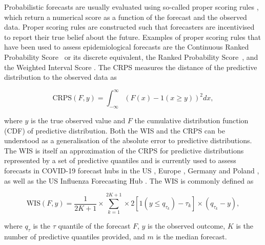 \documentclass{article}
\begin{document}
Probabilistic forecasts are usually evaluated using so-called proper scoring rules \citep{gneitingStrictlyProperScoring2007}, which return a numerical score as a function of the forecast and the observed data. Proper scoring rules are constructed such that forecasters are incentivised to report their true belief about the future. Examples of proper scoring rules that have been used to assess epidemiological forecasts are the Continuous Ranked Probability Score~\citep[CRPS,][]{gneitingStrictlyProperScoring2007} or its discrete equivalent, the Ranked Probability Score~\citep[RPS,][]{funkAssessingPerformanceRealtime2019}, and the Weighted Interval Score \citep{bracherEvaluatingEpidemicForecasts2021}. 
The CRPS measures the distance of the predictive distribution to the observed data as 
\begin{linenomath*}
\begin{equation*}
    \text{CRPS}(F, y) = \int_{-\infty}^\infty \left( F(x) - 1(x \geq y) \right)^2 dx,
\end{equation*}    
\end{linenomath*}
where $y$ is the true observed value and $F$ the cumulative distribution function (CDF) of predictive distribution. Both the WIS and the CRPS can be understood as a generalisation of the absolute error to predictive distributions. The WIS is itself an approximation of the CRPS for predictive distributions represented by a set of predictive quantiles and is currently used to assess forecasts in COVID-19 forecast hubs in the US \citep{cramerCOVID19ForecastHub2020, cramerEvaluationIndividualEnsemble2021}, Europe \citep{sherrattPredictivePerformanceMultimodel2022}, Germany and Poland \citep{bracherShorttermForecastingCOVID192021, bracherNationalSubnationalShortterm2021}, as well as the US Influenza Forecasting Hub \citep{CdcepiFlusightforecastdata2022}. The WIS is commonly defined as 
\begin{linenomath*}
\begin{equation*}
    \text{WIS}(F, y) = \frac{1}{2K + 1} \times \sum_{k = 1}^{2K + 1} \times 2 \left[ 1(y \leq q_{\tau_k}) - \tau_k \right] \times ( q_{\tau_k} - y), 
\end{equation*}
\end{linenomath*}
where $q_{\tau}$ is the $\tau$ quantile of the forecast $F$, $y$ is the observed outcome, $K$ is the number of predictive quantiles provided, and $m$ is the median forecast. 
\end{document}
